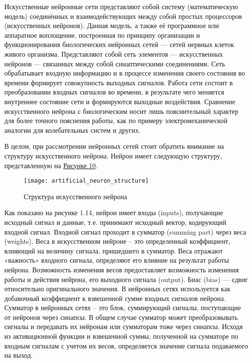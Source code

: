     Искусственные нейронные сети представляют собой систему (математическую модель) соединённых и взаимодействующих между собой простых процессоров (искусственных нейронов). Данная модель, а также её программное или аппаратное воплощение, построенная по принципу организации и функционирования биологических нейронных сетей — сетей нервных клеток живого организма. Представляют собой сеть элементов — искусственных нейронов — связанных между собой синаптическими соединениями. Сеть обрабатывает входную информацию и в процессе изменения своего состояния во времени формирует совокупность выходных сигналов. Работа сети состоит в преобразовании входных сигналов во времени, в результате чего меняется внутреннее состояние сети и формируются выходные воздействия. Сравнение искусственного нейрона с биологическим носит лишь пояснительный характер для более точного пояснения работы, как по примеру электромеханической аналогии для колебательных систем и других.
    
    В целом, при рассмотрении нейронных сетей стоит обратить внимание на структуру искусственного нейрона. Нейрон имеет следующую структуру, представленную на \hyperref[fig:artificial_neuron_structure]{Рисунке 10}.

    \begin{figure}[ht]
        \centering
        \texttt{[image: artificial\_neuron\_structure]}
        \caption{Структура искусственного нейрона}
        \label{fig:artificial_neuron_structure}
    \end{figure}

    Как показано на рисунке 1.14, нейрон имеет входы (inputs), получающие исходный сигнал и данные, т.е. принимают исходный вектор, кодирующий входной сигнал. Входной сигнал проходит в сумматор (summing part) через веса (weights). Веса в искусственном нейроне – это определенный коэффициент, влияющий на величину сигнала, пришедшего в сумматор. Веса отражают «важность» входного сигнала, определяют его влияние на результат работы нейрона. Возможность изменения весов предоставляет возможность изменения работы и действия нейрона, его выходного сигнала (output). Биас (bias) — сдвиг относительно оригинального значения. В нейронных сетях используется как добавочный коэффициент к взвешенной сумме входных сигналов нейрона. Сумматор в нейронных сетях – это блок, суммирующий сигналы, поступающие от нейронов через синапсы. В общем случае сумматор может преобразовывать сигналы и передавать их нейронам или сумматорам тоже через синапсы. Исходя из активационной функции и взвешенной суммы, полученной на сумматоре по входным сигналам с учетом их весов, определяется значение сигнала подаваемого на выход. 
    
